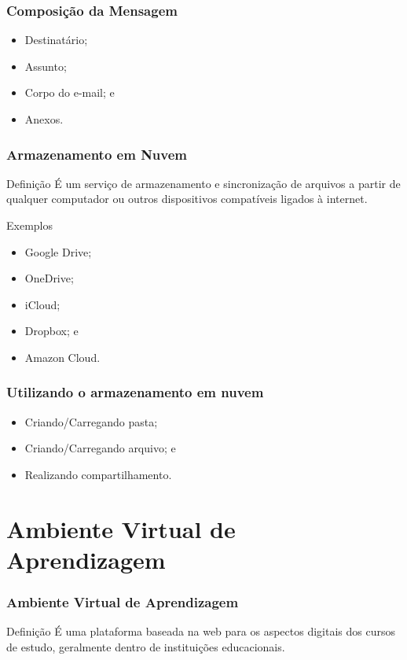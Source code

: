 \documentclass[aspectratio=169]{beamer} %
\begin{document}
\begin{frame}
	\frametitle{Composi\c cão da Mensagem}
	
	\begin{itemize}
		\item Destinatário;
		\item Assunto;
		\item Corpo do e-mail; e
		\item Anexos.
	\end{itemize}
\end{frame}

\begin{frame}
	\frametitle{Armazenamento em Nuvem}
	
	\begin{block}{Defini\c cão}
		É um serviço de armazenamento e sincronização de arquivos a partir de qualquer computador ou outros dispositivos compatíveis ligados à internet.
	\end{block} \vfill
	
	\begin{exampleblock}{Exemplos}
		\begin{itemize}
			\item Google Drive;
			\item OneDrive;
			\item iCloud; 
			\item Dropbox; e
			\item Amazon Cloud.
		\end{itemize}
	\end{exampleblock}
\end{frame}

\begin{frame}
	\frametitle{Utilizando o armazenamento em nuvem}
	
	\begin{itemize}
		\item Criando/Carregando pasta;
		\item Criando/Carregando arquivo; e
		\item Realizando compartilhamento.
	\end{itemize}
\end{frame}

\section{Ambiente Virtual de Aprendizagem}

\begin{frame}
	\frametitle{Ambiente Virtual de Aprendizagem}
	
	\begin{block}{Definição}
		 É uma plataforma baseada na web para os aspectos digitais dos cursos de estudo, geralmente dentro de instituições educacionais.
	\end{block}
\end{frame}
\end{document}
